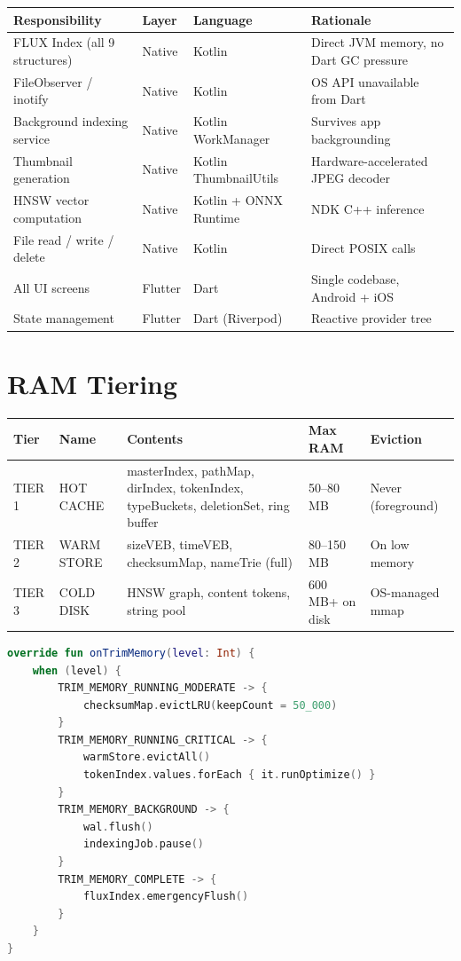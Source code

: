 \begin{longtable}{@{}p{52mm}p{22mm}p{22mm}p{40mm}@{}}
\toprule
\textbf{Responsibility} & \textbf{Layer} & \textbf{Language} & \textbf{Rationale} \\
\midrule
FLUX Index (all 9 structures) & Native & Kotlin & Direct JVM memory, no Dart GC pressure \\
FileObserver / inotify & Native & Kotlin & OS API unavailable from Dart \\
Background indexing service & Native & Kotlin WorkManager & Survives app backgrounding \\
Thumbnail generation & Native & Kotlin ThumbnailUtils & Hardware-accelerated JPEG decoder \\
HNSW vector computation & Native & Kotlin + ONNX Runtime & NDK C++ inference \\
File read / write / delete & Native & Kotlin & Direct POSIX calls \\
All UI screens & Flutter & Dart & Single codebase, Android + iOS \\
State management & Flutter & Dart (Riverpod) & Reactive provider tree \\
\bottomrule
\end{longtable}

\section{RAM Tiering}

\begin{longtable}{@{}p{16mm}p{24mm}p{52mm}p{18mm}p{24mm}@{}}
\toprule
\textbf{Tier} & \textbf{Name} & \textbf{Contents} & \textbf{Max RAM} & \textbf{Eviction} \\
\midrule
TIER 1 & HOT CACHE & masterIndex, pathMap, dirIndex, tokenIndex, typeBuckets, deletionSet, ring buffer & 50--80\,MB & Never (foreground) \\
TIER 2 & WARM STORE & sizeVEB, timeVEB, checksumMap, nameTrie (full) & 80--150\,MB & On low memory \\
TIER 3 & COLD DISK & HNSW graph, content tokens, string pool & 600\,MB+ on disk & OS-managed mmap \\
\bottomrule
\end{longtable}

\begin{lstlisting}[language=Kotlin, caption=Memory Pressure Response]
override fun onTrimMemory(level: Int) {
    when (level) {
        TRIM_MEMORY_RUNNING_MODERATE -> {
            checksumMap.evictLRU(keepCount = 50_000)
        }
        TRIM_MEMORY_RUNNING_CRITICAL -> {
            warmStore.evictAll()
            tokenIndex.values.forEach { it.runOptimize() }
        }
        TRIM_MEMORY_BACKGROUND -> {
            wal.flush()
            indexingJob.pause()
        }
        TRIM_MEMORY_COMPLETE -> {
            fluxIndex.emergencyFlush()
        }
    }
}
\end{lstlisting}

